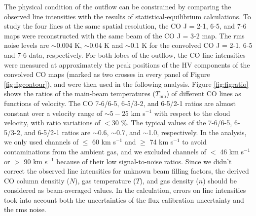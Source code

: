The physical condition of the outflow can be constrained by comparing the observed line intensities with the results of statistical-equilibrium calculations. To study the four lines at the same spatial resolution, the CO J = 2-1, 6-5, and 7-6 maps were reconstructed with the same beam of the CO J = 3-2 map. The rms noise levels are $\sim$0.004 K, $\sim$0.04 K and $\sim$0.1 K for the convolved CO J = 2-1, 6-5 and 7-6 data, respectively. For both lobes of the outflow, the CO line intensities were measured at approximately the peak positions of the HV components of the convolved CO maps (marked as two crosses in every panel of Figure \ref{fig:figcontour}), and were then used in the following analysis. Figure \ref{fig:figratio} shows the ratios of the main-beam temperatures ($T_{\mathrm{mb}}$) of different CO lines as functions of velocity. The CO 7-6/6-5, 6-5/3-2, and 6-5/2-1 ratios are almost constant over a velocity range of $\sim 5-25$ km s$^{-1}$ with respect to the cloud velocity, with ratio variations of $<$30 $\%$. The typical values of the 7-6/6-5, 6-5/3-2, and 6-5/2-1 ratios are $\sim$0.6, $\sim$0.7, and $\sim$1.0, respectively. In the analysis, we only used channels of $\le$ 60 km s$^{-1}$ and $\ge$ 74 km s$^{-1}$ to avoid contaminations from the ambient gas, and we excluded channels of $<$ 46 km s$^{-1}$ or $>$ 90 km s$^{-1}$ because of their low signal-to-noise ratios. Since we didn't correct the observed line intensities for unknown beam filling factors, the derived CO column densitiy ($N$), gas temperature ($T$), and gas density ($n$) should be considered as beam-averaged values. In the calculation, errors on line intensities took into account both the uncertainties of the flux calibration uncertainty and the rms noise. 


